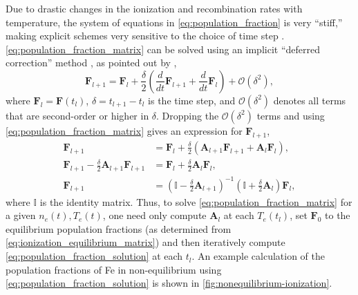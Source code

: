 Due to drastic changes in the ionization and recombination rates with temperature, the system of equations in \autoref{eq:population_fraction} is very ``stiff,'' making explicit schemes very sensitive to the choice of time step \citep{macneice_numerical_1984,bradshaw_numerical_2009}. \autoref{eq:population_fraction_matrix} can be solved using an implicit ``deferred correction'' method \citep{npl_modern_1961}, as pointed out by \citet{macneice_numerical_1984},
\begin{equation}\label{eq:deferred_correction}
    \mathbf{F}_{l+1} = \mathbf{F}_{l} + \frac{\delta}{2}\left(\frac{d}{dt}\mathbf{F}_{l+1} + \frac{d}{dt}\mathbf{F}_l\right) + \mathcal{O}(\delta^2),
\end{equation}
where $\mathbf{F}_l=\mathbf{F}(t_l)$, $\delta = t_{l+1} - t_l$ is the time step, and $\mathcal{O}(\delta^2)$ denotes all terms that are second-order or higher in $\delta$. Dropping the $\mathcal{O}(\delta^2)$ terms and using \autoref{eq:population_fraction_matrix} gives an expression for $\mathbf{F}_{l+1}$,
\begin{align}\label{eq:population_fraction_solution}
    \mathbf{F}_{l+1} &= \mathbf{F}_{l} + \frac{\delta}{2}\left(\mathbf{A}_{l+1}\mathbf{F}_{l+1} + \mathbf{A}_l\mathbf{F}_l\right), \nonumber \\
    \mathbf{F}_{l+1} - \frac{\delta}{2}\mathbf{A}_{l+1}\mathbf{F}_{l+1} &= \mathbf{F}_{l} + \frac{\delta}{2}\mathbf{A}_l\mathbf{F}_l, \nonumber \\
    \mathbf{F}_{l+1} &= \left(\mathbb{I} - \frac{\delta}{2}\mathbf{A}_{l+1}\right)^{-1}\left(\mathbb{I} + \frac{\delta}{2}\mathbf{A}_l\right)\mathbf{F}_l,
\end{align}
where $\mathbb{I}$ is the identity matrix. Thus, to solve \autoref{eq:population_fraction_matrix} for a given $n_e(t),T_e(t)$, one need only compute $\mathbf{A}_l$ at each $T_e(t_l)$, set $\mathbf{F}_0$ to the equilibrium population fractions (as determined from \autoref{eq:ionization_equilibrium_matrix}) and then iteratively compute \autoref{eq:population_fraction_solution} at each $t_l$. An example calculation of the population fractions of Fe in non-equilibrium using \autoref{eq:population_fraction_solution} is shown in \autoref{fig:nonequilibrium-ionization}.

